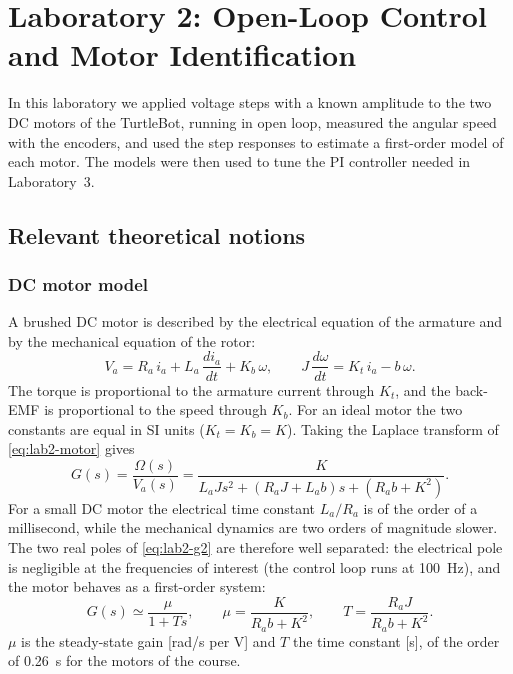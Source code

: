 \documentclass[english]{article}
\begin{document}
\tableofcontents \newpage

\section{Laboratory 2: Open-Loop Control and Motor Identification}
\label{sec:lab2}

In this laboratory we applied voltage steps with a known amplitude to the two DC motors of the TurtleBot, running in
open loop, measured the angular speed with the encoders, and used the step responses to estimate a first-order model
of each motor. The models were then used to tune the PI controller needed in Laboratory~3.

\subsection{Relevant theoretical notions}
\label{sec:lab2-theory}

\subsubsection{DC motor model}

A brushed DC motor is described by the electrical equation of the armature and by the mechanical equation of the
rotor:
\begin{equation}
  V_a = R_a\,i_a + L_a\,\frac{di_a}{dt} + K_b\,\omega, \qquad J\,\frac{d\omega}{dt} = K_t\,i_a - b\,\omega .
  \label{eq:lab2-motor}
\end{equation}
The torque is proportional to the armature current through $K_t$, and the back-EMF is proportional to the speed
through $K_b$. For an ideal motor the two constants are equal in SI units ($K_t = K_b = K$). Taking the Laplace
transform of \eqref{eq:lab2-motor} gives
\begin{equation}
  G(s) = \frac{\Omega(s)}{V_a(s)} = \frac{K}{L_aJs^2 + (R_aJ+L_ab)s + (R_ab+K^2)} .
  \label{eq:lab2-g2}
\end{equation}
For a small DC motor the electrical time constant $L_a/R_a$ is of the order of a millisecond, while the mechanical
dynamics are two orders of magnitude slower. The two real poles of \eqref{eq:lab2-g2} are therefore well separated:
the electrical pole is negligible at the frequencies of interest (the control loop runs at 100~Hz), and the motor
behaves as a first-order system:
\begin{equation}
  G(s) \simeq \frac{\mu}{1+Ts}, \qquad \mu = \frac{K}{R_ab+K^2}, \qquad T = \frac{R_aJ}{R_ab+K^2} .
  \label{eq:lab2-first}
\end{equation}
$\mu$ is the steady-state gain [rad/s per V] and $T$ the time constant [s], of the order of 0.26~s for the motors of
the course.
\end{document}
